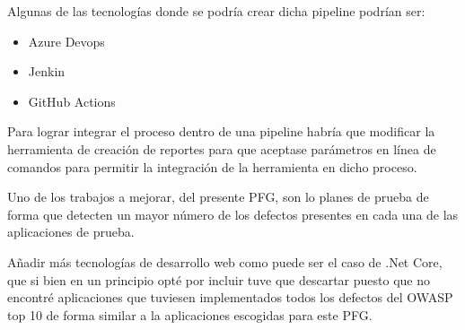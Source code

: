 Algunas de las tecnologías donde se podría crear dicha \gls{pipeline} podrían ser:

\begin{itemize}
    \item Azure Devops
    \item Jenkin 
    \item GitHub Actions
\end{itemize}

Para lograr integrar el proceso dentro de una \gls{pipeline} habría que modificar la herramienta de creación de reportes para que 
aceptase parámetros en línea de comandos para permitir la integración de la herramienta en dicho proceso.

Uno de los trabajos  a mejorar, del presente PFG, son lo planes de prueba de forma que detecten un mayor número de los defectos 
presentes en cada una de las aplicaciones de prueba.

Añadir más tecnologías de desarrollo web como puede ser el caso de .Net Core, que si bien en un principio opté por incluir tuve 
que descartar puesto que no encontré aplicaciones que tuviesen implementados todos los defectos 
del OWASP top 10 de forma similar a la aplicaciones escogidas para este PFG.

